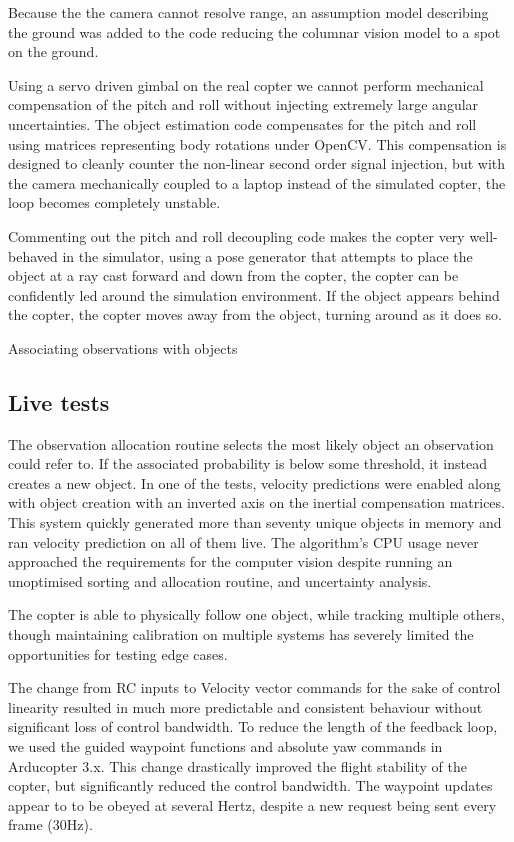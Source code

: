 \documentclass[a4paper, 11pt, titlepage]{article}
\begin{document}
    Because the the camera cannot resolve range, an assumption model describing the ground was added to the code reducing the columnar vision model to a spot on the ground.

    Using a servo driven gimbal on the real copter we cannot perform mechanical compensation of the pitch and roll without injecting extremely large angular uncertainties.
    The object estimation code compensates for the pitch and roll using matrices representing body rotations under OpenCV.
    This compensation is designed to cleanly counter the non-linear second order signal injection, but with the camera mechanically coupled to a laptop instead of the simulated copter, the loop becomes completely unstable.

    Commenting out the pitch and roll decoupling code makes the copter very well-behaved in the simulator, using a pose generator that attempts to place the object at a ray cast forward and down from the copter, the copter can be confidently led around the simulation environment.  If the object appears behind the copter, the copter moves away from the object, turning around as it does so.

    Associating observations with objects 


  \subsection{Live tests}
    The observation allocation routine selects the most likely object an observation could refer to. If the associated probability is below some threshold, it instead creates a new object.
    In one of the tests, velocity predictions were enabled along with object creation with an inverted axis on the inertial compensation matrices. This system quickly generated more than seventy unique objects in memory and ran velocity prediction on all of them live. The algorithm's CPU usage never approached the requirements for the computer vision despite running an unoptimised sorting and allocation routine, and uncertainty analysis.
    

    The copter is able to physically follow one object, while tracking multiple others, though maintaining calibration on multiple systems has severely limited the opportunities for testing edge cases.

    The change from RC inputs to Velocity vector commands for the sake of control linearity resulted in much more predictable and consistent behaviour without significant loss of control bandwidth.
    To reduce the length of the feedback loop, we used the guided waypoint functions and absolute yaw commands in Arducopter 3.x.  This change drastically improved the flight stability of the copter, but significantly reduced the control bandwidth.  The waypoint updates appear to to be obeyed at several Hertz, despite a new request being sent every frame (30Hz).
\end{document}
